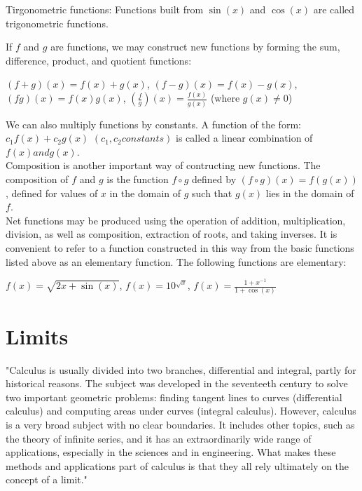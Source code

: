\documentclass{article}
\begin{document}
Tirgonometric functions: Functions built from $\sin(x)$ and $\cos(x)$ are called trigonometric functions.

If $f$ and $g$ are functions, we may construct new functions by forming the sum, difference, product, and quotient functions:\\
\begin{center} $(f + g)(x) = f(x) + g(x)$, $(f - g)(x) = f(x) - g(x)$, $(fg)(x) = f(x)g(x)$, $(\frac{f}{g})(x) = \frac{f(x)}{g(x)}$ (where $g(x) \neq 0$)\end{center}

We can also multiply functions by constants. A function of the form: $c_1f(x) + c_2g(x)$ $(c_1, c_2 constants)$ is called a linear combination of $f(x) and g(x)$.\\

Composition is another important way of contructing new functions. The composition of $f$ and $g$ is the function $f \circ g$ defined by $(f \circ g)(x) = f(g(x))$, defined for values of $x$ in the domain of $g$ such that $g(x)$ lies in the domain of $f$.\\

Net functions may be produced using the operation of addition, multiplication, division, as well as composition, extraction of roots, and taking inverses. It is convenient to refer to a function constructed in this way from the basic functions listed above as an elementary function. The following functions are elementary:\\
\begin{center} $f(x) = \sqrt{2x + \sin(x)}$, $f(x) = 10^{\sqrt{x}}$, $f(x) = \frac{1 + x^{-1}}{1 + \cos(x)}$\end{center}

\section* {Limits}

"Calculus is usually divided into two branches, differential and integral, partly for historical reasons. The subject was developed in the seventeeth century to solve two important geometric problems: finding tangent lines to curves (differential calculus) and computing areas under curves (integral calculus). However, calculus is a very broad subject with no clear boundaries. It includes other topics, such as the theory of infinite series, and it has an extraordinarily wide range of applications, especially in the sciences and in engineering. What makes these methods and applications part of calculus is that they all rely ultimately on the concept of a limit."\\
\end{document}
